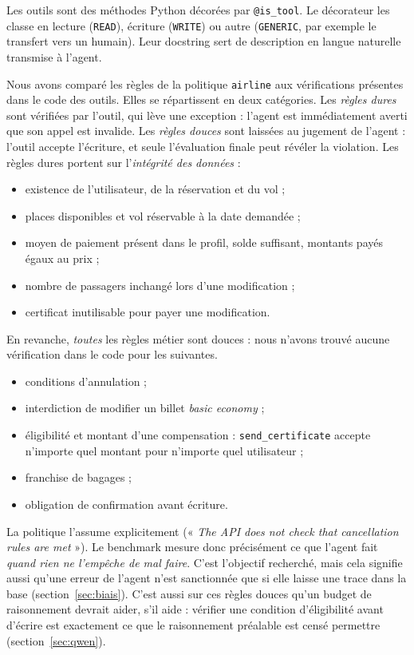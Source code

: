 Les outils sont des méthodes Python décorées par \texttt{@is\_tool}. Le décorateur les classe en lecture (\texttt{READ}), écriture (\texttt{WRITE}) ou autre (\texttt{GENERIC}, par exemple le transfert vers un humain). Leur docstring sert de description en langue naturelle transmise à l'agent.

Nous avons comparé les règles de la politique \texttt{airline} aux vérifications présentes dans le code des outils. Elles se répartissent en deux catégories. Les \emph{règles dures} sont vérifiées par l'outil, qui lève une exception : l'agent est immédiatement averti que son appel est invalide. Les \emph{règles douces} sont laissées au jugement de l'agent : l'outil accepte l'écriture, et seule l'évaluation finale peut révéler la violation. Les règles dures portent sur l'\emph{intégrité des données} :
\begin{itemize}[nosep]
  \item existence de l'utilisateur, de la réservation et du vol ;
  \item places disponibles et vol réservable à la date demandée ;
  \item moyen de paiement présent dans le profil, solde suffisant, montants payés égaux au prix ;
  \item nombre de passagers inchangé lors d'une modification ;
  \item certificat inutilisable pour payer une modification.
\end{itemize}
En revanche, \emph{toutes} les règles métier sont douces : nous n'avons trouvé aucune vérification dans le code pour les suivantes.
\begin{itemize}[nosep]
  \item conditions d'annulation ;
  \item interdiction de modifier un billet \emph{basic economy} ;
  \item éligibilité et montant d'une compensation : \texttt{send\_certificate} accepte n'importe quel montant pour n'importe quel utilisateur ;
  \item franchise de bagages ;
  \item obligation de confirmation avant écriture.
\end{itemize}
La politique l'assume explicitement (« \emph{The API does not check that cancellation rules are met} »). Le benchmark mesure donc précisément ce que l'agent fait \emph{quand rien ne l'empêche de mal faire}. C'est l'objectif recherché, mais cela signifie aussi qu'une erreur de l'agent n'est sanctionnée que si elle laisse une trace dans la base (section~\ref{sec:biais}). C'est aussi sur ces règles douces qu'un budget de raisonnement devrait aider, s'il aide : vérifier une condition d'éligibilité avant d'écrire est exactement ce que le raisonnement préalable est censé permettre (section~\ref{sec:qwen}).
